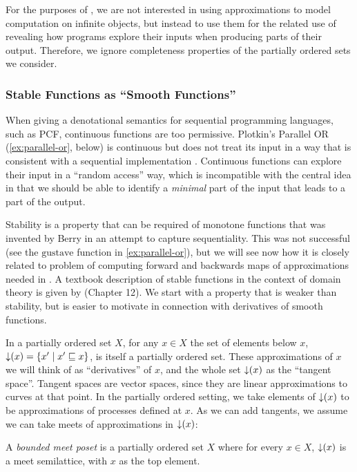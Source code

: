 For the purposes of \GPS, we are not interested in using approximations to model computation on infinite objects, but instead to use them for the related use of revealing how programs explore their inputs when producing parts of their output. Therefore, we ignore completeness properties of the partially ordered sets we consider.

\subsubsection{Stable Functions as ``Smooth Functions''}


When giving a denotational semantics for sequential programming languages, such as PCF, continuous functions are too permissive. Plotkin's Parallel OR (\autoref{ex:parallel-or}, below) is continuous but does not treat its input in a way that is consistent with a sequential implementation \cite{plotkin77lcf}. Continuous functions can explore their input in a ``random access'' way, which is incompatible with the central idea in \GPS that we should be able to identify a \emph{minimal} part of the input that leads to a part of the output.

Stability is a property that can be required of monotone functions that was invented by Berry \cite{berry86} in an attempt to capture sequentiality. This was not successful (see the $\mathrm{gustave}$ function in \autoref{ex:parallel-or}), but we will see now how it is closely related to problem of computing forward and backwards maps of approximations needed in \GPS. A textbook description of stable functions in the context of domain theory is given by \citet{amadio-curien} (Chapter 12). We start with a property that is weaker than stability, but is easier to motivate in connection with derivatives of smooth functions.

In a partially ordered set $X$, for any $x \in X$ the set of elements below $x$, $\mathop{\downarrow}(x) = \{ x' \mid x' \sqsubseteq x \}$, is itself a partially ordered set. These approximations of $x$ we will think of as ``derivatives'' of $x$, and the whole set $\mathop{\downarrow}(x)$ as the ``tangent space''. Tangent spaces are vector spaces, since they are linear approximations to curves at that point. In the partially ordered setting, we take elements of $\mathop{\downarrow}(x)$ to be approximations of processes defined at $x$. As we can add tangents, we assume we can take meets of approximations in $\mathop{\downarrow}(x)$:

\begin{definition}
  A \emph{bounded meet poset} is a partially ordered set $X$ where for every $x \in X$, $\mathop{\downarrow}(x)$ is a meet semilattice, with $x$ as the top element.
\end{definition}

